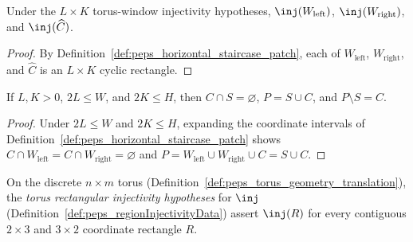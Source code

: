 \begin{lemma}
    \label{lem:peps_horizontal_staircase_window_injectivity}
    \leanok
    Under the $L\times K$ torus-window injectivity hypotheses,
    $\inj(W_{\mathrm{left}})$, $\inj(W_{\mathrm{right}})$, and
    $\inj(\widehat C)$.
\end{lemma}
\begin{proof}
    \leanok
    By Definition~\ref{def:peps_horizontal_staircase_patch}, each of
    $W_{\mathrm{left}}$, $W_{\mathrm{right}}$, and $\widehat C$ is an
    $L\times K$ cyclic rectangle.
\end{proof}

\begin{lemma}
    \label{lem:peps_horizontal_staircase_patch_decomposition}
    \leanok
    If $L,K>0$, $2L\le W$, and $2K\le H$, then $C\cap S=\varnothing$,
    $P=S\cup C$, and $P\setminus S=C$.
\end{lemma}
\begin{proof}
    \leanok
    Under $2L\le W$ and $2K\le H$, expanding the coordinate intervals of
    Definition~\ref{def:peps_horizontal_staircase_patch} shows
    $C\cap W_{\mathrm{left}}=C\cap W_{\mathrm{right}}=\varnothing$ and
    $P=W_{\mathrm{left}}\cup W_{\mathrm{right}}\cup C=S\cup C$.
\end{proof}

\begin{definition}%
    \label{def:peps_torusRectangleInjectivityHypotheses}
    \leanok
    On the discrete $n\times m$ torus
    (Definition~\ref{def:peps_torus_geometry_translation}), the \emph{torus
        rectangular injectivity hypotheses} for $\inj$
    (Definition~\ref{def:peps_regionInjectivityData}) assert $\inj(R)$ for
    every contiguous $2\times 3$ and $3\times 2$ coordinate rectangle $R$.
\end{definition}

